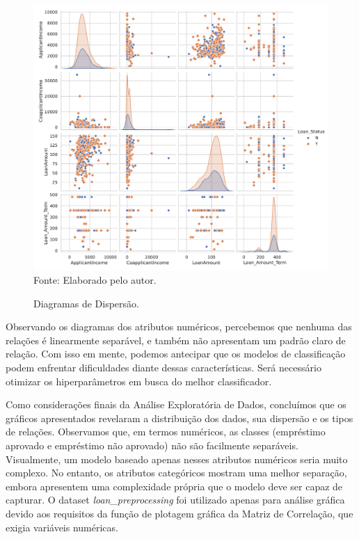 \documentclass[a4paper,12pt]{article} %
\begin{document}
\begin{figure}[H]
    \centering
    \caption{Diagramas de Dispersão.}
    \includegraphics[scale=0.5]{Figures/pairplot.pdf} \\
    Fonte: Elaborado pelo autor.
    \label{fig:6}
\end{figure}

Observando os diagramas dos atributos numéricos, percebemos que nenhuma das relações é linearmente separável, e também não apresentam um padrão claro de relação. Com isso em mente, podemos antecipar que os modelos de classificação podem enfrentar dificuldades diante dessas características. Será necessário otimizar os hiperparâmetros em busca do melhor classificador.

Como considerações finais da Análise Exploratória de Dados, concluímos que os gráficos apresentados revelaram a distribuição dos dados, sua dispersão e os tipos de relações. Observamos que, em termos numéricos, as classes (empréstimo aprovado e empréstimo não aprovado) não são facilmente separáveis. Visualmente, um modelo baseado apenas nesses atributos numéricos seria muito complexo. No entanto, os atributos categóricos mostram uma melhor separação, embora apresentem uma complexidade própria que o modelo deve ser capaz de capturar. O dataset \textit{loan\_preprocessing} foi utilizado apenas para análise gráfica devido aos requisitos da função de plotagem gráfica da Matriz de Correlação, que exigia variáveis numéricas.
\end{document}
